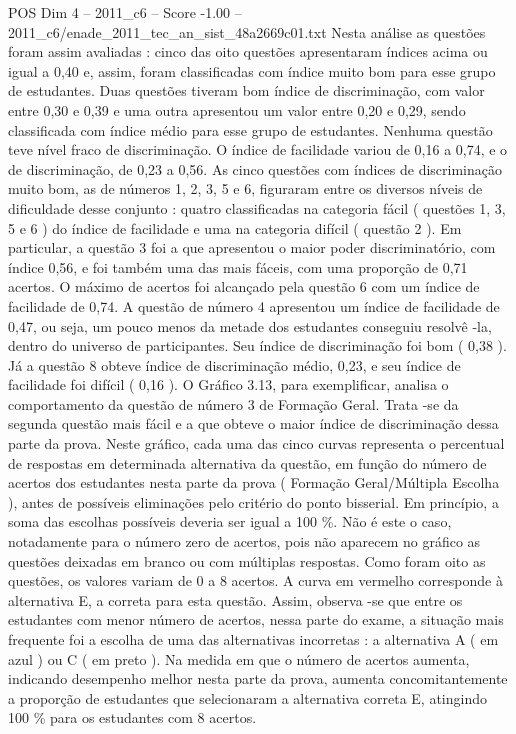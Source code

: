 \begin{textsample}{POS Dim 4 – 2011\_c6 – Score -1.00 – 2011\_c6/enade\_2011\_tec\_an\_sist\_48a2669c01.txt}
Nesta análise as questões foram assim avaliadas : cinco das oito questões apresentaram índices acima ou igual a 0,40 e, assim, foram classificadas com índice muito bom para esse grupo de estudantes.
Duas questões tiveram bom índice de discriminação, com valor entre 0,30 e 0,39 e uma outra apresentou um valor entre 0,20 e 0,29, sendo classificada com índice médio para esse grupo de estudantes.
Nenhuma questão teve nível fraco de discriminação.
O índice de facilidade variou de 0,16 a 0,74, e o de discriminação, de 0,23 a 0,56.
As cinco questões com índices de discriminação muito bom, as de números 1, 2, 3, 5 e 6, figuraram entre os diversos níveis de dificuldade desse conjunto : quatro classificadas na categoria fácil ( questões 1, 3, 5 e 6 ) do índice de facilidade e uma na categoria difícil ( questão 2 ).
Em particular, a questão 3 foi a que apresentou o maior poder discriminatório, com índice 0,56, e foi também uma das mais fáceis, com uma proporção de 0,71 acertos.
O máximo de acertos foi alcançado pela questão 6 com um índice de facilidade de 0,74.
A questão de número 4 apresentou um índice de facilidade de 0,47, ou seja, um pouco menos da metade dos estudantes conseguiu resolvê -la, dentro do universo de participantes.
Seu índice de discriminação foi bom ( 0,38 ).
Já a questão 8 obteve índice de discriminação médio, 0,23, e seu índice de facilidade foi difícil ( 0,16 ).
O Gráfico 3.13, para exemplificar, analisa o comportamento da questão de número 3 de Formação Geral.
Trata -se da segunda questão mais fácil e a que obteve o maior índice de discriminação dessa parte da prova.
Neste gráfico, cada uma das cinco curvas representa o percentual de respostas em determinada alternativa da questão, em função do número de acertos dos estudantes nesta parte da prova ( Formação Geral/Múltipla Escolha ), antes de possíveis eliminações pelo critério do ponto bisserial.
Em princípio, a soma das escolhas possíveis deveria ser igual a 100 \%.
Não é este o caso, notadamente para o número zero de acertos, pois não aparecem no gráfico as questões deixadas em branco ou com múltiplas respostas.
Como foram oito as questões, os valores variam de 0 a 8 acertos.
A curva em vermelho corresponde à alternativa E, a correta para esta questão.
Assim, observa -se que entre os estudantes com menor número de acertos, nessa parte do exame, a situação mais frequente foi a escolha de uma das alternativas incorretas : a alternativa A ( em azul ) ou C ( em preto ).
Na medida em que o número de acertos aumenta, indicando desempenho melhor nesta parte da prova, aumenta concomitantemente a proporção de estudantes que selecionaram a alternativa correta E, atingindo 100 \% para os estudantes com 8 acertos.

\end{textsample}
